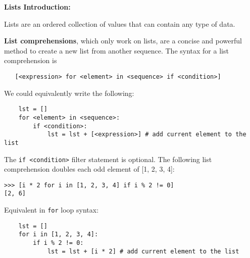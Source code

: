 \textbf{Lists Introduction:}

Lists are an ordered collection of values that can contain any type of data.

\textbf{List comprehensions}, which only work on lists, are a concise and powerful method to create a new list from another sequence. The syntax for a list comprehension is
   \begin{lstlisting}
   [<expression> for <element> in <sequence> if <condition>]
   \end{lstlisting}

   We could equivalently write the following: 
\begin{lstlisting}
	lst = []
	for <element> in <sequence>:
		if <condition>:
			lst = lst + [<expression>] # add current element to the list
\end{lstlisting}

The \lstinline{if <condition>} filter statement is optional. The following list comprehension doubles each odd element of [1, 2, 3, 4]:


\begin{lstlisting}
>>> [i * 2 for i in [1, 2, 3, 4] if i % 2 != 0] 
[2, 6]
\end{lstlisting}

Equivalent in \lstinline{for} loop syntax:

\begin{lstlisting}
	lst = []
	for i in [1, 2, 3, 4]:
		if i % 2 != 0:
			lst = lst + [i * 2] # add current element to the list
\end{lstlisting}

